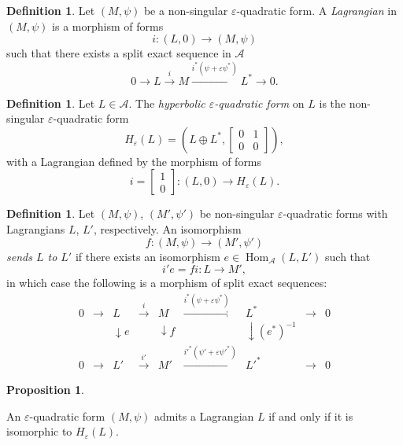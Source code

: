 \documentclass{article}
\theoremstyle{definition}
\newtheorem{defn}[theorem]{Definition}
\newtheorem{prop}[theorem]{Proposition}
\begin{document}
\begin{defn}

 Let \( (M, \psi) \) be a non-singular \( \varepsilon \)-quadratic form. A \emph{Lagrangian} in \( (M, \psi) \) is a morphism of forms
\[
i : (L, 0) \to (M, \psi)
\]
such that there exists a split exact sequence in \( \mathcal{A} \)
\[
0 \to L \xrightarrow{i} M \xrightarrow{i^*(\psi + \varepsilon \psi^*)} L^* \to 0.
\]
\end{defn}

\begin{defn}
    
Let \( L \in \mathcal{A} \). The \emph{hyperbolic \( \varepsilon \)-quadratic form} on \( L \) is the non-singular \( \varepsilon \)-quadratic form
\[
H_\varepsilon(L) = \left(L \oplus L^*, \begin{bmatrix} 0 & 1 \\ 0 & 0 \end{bmatrix} \right),
\]
with a Lagrangian defined by the morphism of forms
\[
i = \begin{bmatrix} 1 \\ 0 \end{bmatrix} : (L, 0) \to H_\varepsilon(L).
\]

\end{defn}
\begin{defn}
    
Let \( (M, \psi) \), \( (M', \psi') \) be non-singular \( \varepsilon \)-quadratic forms with Lagrangians \( L \), \( L' \), respectively. An isomorphism
\[
f : (M, \psi) \to (M', \psi')
\]
\emph{sends \( L \) to \( L' \)} if there exists an isomorphism \( e \in \operatorname{Hom}_{\mathcal{A}}(L, L') \) such that
\[
i' e = f i : L \to M',
\]
in which case the following is a morphism of split exact sequences:
\[
\begin{array}{ccccccccc}
0 & \to & L & \xrightarrow{i} & M & \xrightarrow{i^*(\psi + \varepsilon \psi^*)} & L^* & \to & 0 \\
  &     & \downarrow e &       & \downarrow f & & \downarrow (e^*)^{-1} & & \\
0 & \to & L' & \xrightarrow{i'} & M' & \xrightarrow{i'^*(\psi' + \varepsilon \psi'^*)} & L'^* & \to & 0
\end{array}
\]
\end{defn}
\begin{prop}\label{prop:normalization}
    
An \( \varepsilon \)-quadratic form \( (M, \psi) \) admits a Lagrangian \( L \) if and only if it is isomorphic to \( H_\varepsilon(L) \).

\end{prop} 
\end{document}
